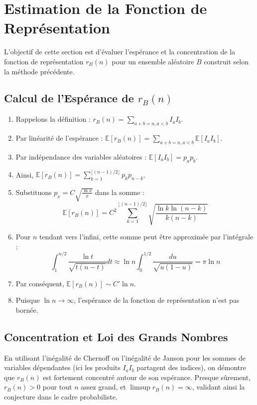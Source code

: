 \documentclass[12pt]{article}
\begin{document}
\section{Estimation de la Fonction de Représentation}
L'objectif de cette section est d'évaluer l'espérance et la concentration de la fonction de représentation $r_B(n)$ pour un ensemble aléatoire $B$ construit selon la méthode précédente.

\subsection{Calcul de l'Espérance de $r_B(n)$}
\begin{enumerate}
    \item Rappelons la définition : $r_B(n) = \sum_{a+b=n, a<b} I_a I_b$.
    \item Par linéarité de l'espérance : $\mathbb{E}[r_B(n)] = \sum_{a+b=n, a<b} \mathbb{E}[I_a I_b]$.
    \item Par indépendance des variables aléatoires : $\mathbb{E}[I_a I_b] = p_a p_b$.
    \item Ainsi, $\mathbb{E}[r_B(n)] = \sum_{k=1}^{\lfloor (n-1)/2 \rfloor} p_k p_{n-k}$.
    \item Substituons $p_x = C \sqrt{\frac{\ln x}{x}}$ dans la somme :
    \begin{equation*}
    \mathbb{E}[r_B(n)] = C^2 \sum_{k=1}^{\lfloor (n-1)/2 \rfloor} \sqrt{\frac{\ln k \ln(n-k)}{k(n-k)}}
    \end{equation*}
    \item Pour $n$ tendant vers l'infini, cette somme peut être approximée par l'intégrale :
    \begin{equation*}
    \int_1^{n/2} \frac{\ln t}{\sqrt{t(n-t)}} dt \approx \ln n \int_0^{1/2} \frac{du}{\sqrt{u(1-u)}} = \pi \ln n
    \end{equation*}
    \item Par conséquent, $\mathbb{E}[r_B(n)] \sim C' \ln n$.
    \item Puisque $\ln n \to \infty$, l'espérance de la fonction de représentation n'est pas bornée.
\end{enumerate}

\subsection{Concentration et Loi des Grands Nombres}
En utilisant l'inégalité de Chernoff ou l'inégalité de Janson pour les sommes de variables dépendantes (ici les produits $I_a I_b$ partagent des indices), on démontre que $r_B(n)$ est fortement concentré autour de son espérance. Presque sûrement, $r_B(n) > 0$ pour tout $n$ assez grand, et $\limsup r_B(n) = \infty$, validant ainsi la conjecture dans le cadre probabiliste.
\end{document}
